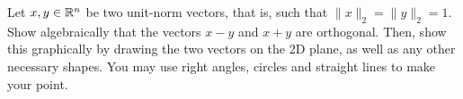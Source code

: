 \item Let $x,y\in\mathbb{R}^{n}$ be two unit-norm vectors, that is, such that $\|x\|_2 = \|y\|_2=1$. Show algebraically that the vectors $x-y$ and $x+y$ are orthogonal. Then, show this graphically by drawing the two vectors on the 2D plane, as well as any other necessary shapes. You may use right angles, circles and straight lines to make your point.